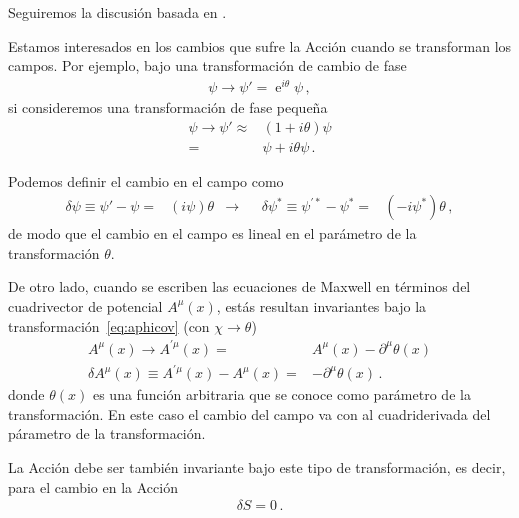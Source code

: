 Seguiremos la discusión basada en \cite{Brading:2000hc,Brading:2003nv,Sundermeyer:2014kha}.

\begin{frame}
Estamos interesados en los cambios que sufre la Acción cuando se transforman los campos. Por ejemplo, bajo una transformación de cambio de fase
\begin{align}
  \label{eq:phchg}
  \psi \to \psi'=\operatorname{e}^{i \theta}\psi\,,
\end{align}
si consideremos una transformación de fase pequeña
\begin{align}
  \psi \to \psi'\approx& (1+i\theta)\psi \nonumber\\
                      =&  \psi+i\theta\psi\,.
\end{align} 

Podemos definir el cambio en el campo como
\begin{align}
  \label{eq:deltamatter}
  \delta \psi\equiv \psi'-\psi=&(i\psi) \theta &\to&  & \delta \psi^{*}\equiv \psi^{\prime *}-\psi^*=&(-i\psi^{*}) \theta \,,
\end{align}
de modo que el cambio en el campo es lineal en el parámetro de la transformación $\theta$.
\end{frame}

\begin{frame}
De otro lado, cuando se escriben las ecuaciones de Maxwell en términos del cuadrivector de potencial $A^{\mu}(x)$,      estás resultan invariantes bajo la transformación~\eqref{eq:aphicov} (con $\chi\to\theta$)
\begin{align}
  \label{eq:deltarad}
  A^{\mu}(x)\to A^{\prime\mu}(x)= &  A^{\mu}(x) -\partial^{\mu} \theta(x) \nonumber\\
    \delta A^{\mu}(x)\equiv A^{\prime\mu}(x) -A^{\mu}(x)=& -\partial^{\mu} \theta(x)\,.
\end{align}
donde $\theta(x)$ es una función arbitraria que se conoce como parámetro de la transformación. En este caso el cambio del campo va con al cuadriderivada del párametro de la transformación.

La Acción  debe ser también invariante bajo este tipo de transformación, es decir, para el cambio en la Acción
\begin{align}
  \delta S=0\,.
\end{align}
\end{frame}


